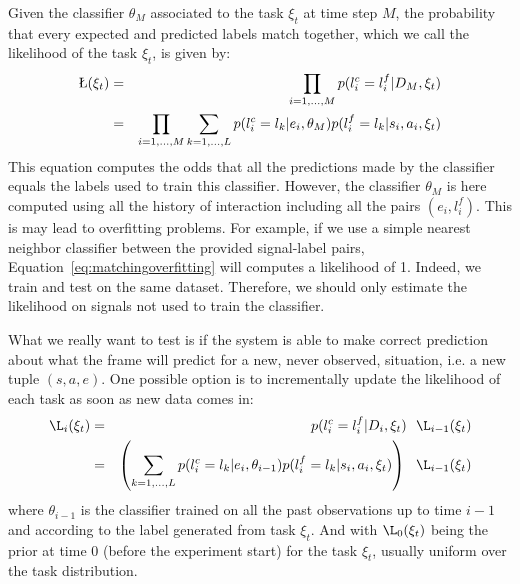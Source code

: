 Given the classifier $\theta_M$ associated to the task $\xi_t$ at time step $M$, the probability that every expected and predicted labels match together, which we call the likelihood of the task $\xi_t$, is given by:
%
\begin{eqnarray}
\L(\xi_t) &=& \prod_{i = 1,\ldots,M} p(l^c_i = l^f_i | D_M, \xi_t) \nonumber \\ 
&=& \prod_{i = 1,\ldots,M} \sum_{k = 1, \ldots, L} p(l^c_i = l_k | e_i, \theta_M) p(l^f_i = l_k | s_i, a_i, \xi_t)
\label{eq:matchingoverfitting} 
\end{eqnarray}
%
This equation computes the odds that all the predictions made by the classifier equals the labels used to train this classifier. However, the classifier $\theta_{M}$ is here computed using all the history of interaction including all the pairs $(e_i, l^f_i)$. This is may lead to overfitting problems. For example, if we use a simple nearest neighbor classifier between the provided signal-label pairs, Equation~\ref{eq:matchingoverfitting} will computes a likelihood of 1. Indeed, we train and test on the same dataset. Therefore, we should only estimate the likelihood on signals not used to train the classifier.

What we really want to test is if the system is able to make correct prediction about what the frame will predict for a new, never observed, situation, i.e. a new tuple $(s,a,e)$. One possible option is to incrementally update the likelihood of each task as soon as new data comes in:
%
\begin{eqnarray}
\L_i(\xi_t) &=& p(l^c_i = l^f_i | D_i, \xi_t) ~~ \L_{i-1}(\xi_t) \nonumber \\ 
&=& \left( \sum_{k = 1, \ldots, L} p(l^c_i = l_k | e_i, \theta_{i-1}) p(l^f_i = l_k | s_i, a_i, \xi_t) \right) ~~ \L_{i-1}(\xi_t) 
\label{eq:matchingfilter} 
\end{eqnarray}
%
where $\theta_{i-1}$ is the classifier trained on all the past observations up to time $i-1$ and according to the label generated from task $\xi_t$. And with $\L_{0}(\xi_t)$ being the prior at time 0 (before the experiment start) for the task $\xi_t$, usually uniform over the task distribution.


